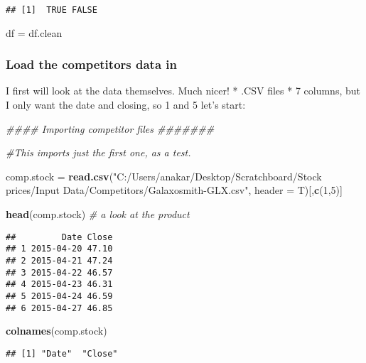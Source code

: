 \documentclass[
]{article}
\newenvironment{Shaded}{\begin{snugshade}}{\end{snugshade}}
\newcommand{\CommentTok}[1]{\textcolor[rgb]{0.56,0.35,0.01}{\textit{#1}}}
\newcommand{\DataTypeTok}[1]{\textcolor[rgb]{0.13,0.29,0.53}{#1}}
\newcommand{\DecValTok}[1]{\textcolor[rgb]{0.00,0.00,0.81}{#1}}
\newcommand{\KeywordTok}[1]{\textcolor[rgb]{0.13,0.29,0.53}{\textbf{#1}}}
\newcommand{\NormalTok}[1]{#1}
\newcommand{\StringTok}[1]{\textcolor[rgb]{0.31,0.60,0.02}{#1}}
\begin{document}
\begin{verbatim}
## [1]  TRUE FALSE
\end{verbatim}

\begin{Shaded}
\begin{Highlighting}[]
\NormalTok{df =}\StringTok{ }\NormalTok{df.clean}
\end{Highlighting}
\end{Shaded}

\hypertarget{load-the-competitors-data-in}{%
\subsubsection{Load the competitors data
in}\label{load-the-competitors-data-in}}

I first will look at the data themselves. Much nicer! * .CSV files * 7
columns, but I only want the date and closing, so 1 and 5 let's start:

\begin{Shaded}
\begin{Highlighting}[]
\CommentTok{#### Importing competitor files #######}


\CommentTok{#This imports just the first one, as a test.}

\NormalTok{comp.stock =}\StringTok{ }\KeywordTok{read.csv}\NormalTok{(}\StringTok{"C:/Users/anakar/Desktop/Scratchboard/Stock prices/Input Data/Competitors/Galaxosmith-GLX.csv"}\NormalTok{, }\DataTypeTok{header =}\NormalTok{ T)[,}\KeywordTok{c}\NormalTok{(}\DecValTok{1}\NormalTok{,}\DecValTok{5}\NormalTok{)]}


\KeywordTok{head}\NormalTok{(comp.stock)                             }\CommentTok{# a look at the product}
\end{Highlighting}
\end{Shaded}

\begin{verbatim}
##         Date Close
## 1 2015-04-20 47.10
## 2 2015-04-21 47.24
## 3 2015-04-22 46.57
## 4 2015-04-23 46.31
## 5 2015-04-24 46.59
## 6 2015-04-27 46.85
\end{verbatim}

\begin{Shaded}
\begin{Highlighting}[]
\KeywordTok{colnames}\NormalTok{(comp.stock)}
\end{Highlighting}
\end{Shaded}

\begin{verbatim}
## [1] "Date"  "Close"
\end{verbatim}
\end{document}
